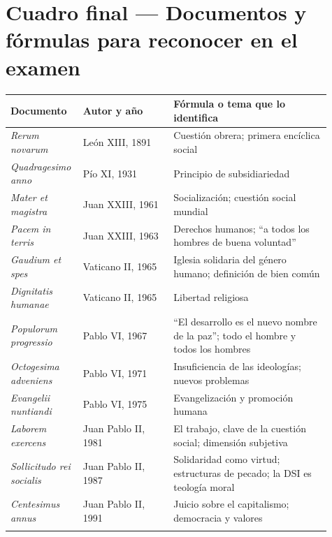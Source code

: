 \documentclass[10pt,a4paper]{article}
\begin{document}
\clearpage\section{Cuadro final --- Documentos y fórmulas para reconocer en el examen}

{\small\renewcommand{\arraystretch}{1.25}
\begin{longtable}{>{\raggedright\arraybackslash}p{0.163\linewidth}>{\raggedright\arraybackslash}p{0.275\linewidth}>{\raggedright\arraybackslash}p{0.472\linewidth}}
\toprule
\textbf{Documento} & \textbf{Autor y año} & \textbf{Fórmula o tema que lo identifica} \\ \midrule \endhead
\textit{Rerum novarum} & León XIII, 1891 & Cuestión obrera; primera encíclica social \\ \addlinespace[2pt]
\textit{Quadragesimo anno} & Pío XI, 1931 & Principio de subsidiariedad \\ \addlinespace[2pt]
\textit{Mater et magistra} & Juan XXIII, 1961 & Socialización; cuestión social mundial \\ \addlinespace[2pt]
\textit{Pacem in terris} & Juan XXIII, 1963 & Derechos humanos; ``a todos los hombres de buena voluntad'' \\ \addlinespace[2pt]
\textit{Gaudium et spes} & Vaticano II, 1965 & Iglesia solidaria del género humano; definición de bien común \\ \addlinespace[2pt]
\textit{Dignitatis humanae} & Vaticano II, 1965 & Libertad religiosa \\ \addlinespace[2pt]
\textit{Populorum progressio} & Pablo VI, 1967 & ``El desarrollo es el nuevo nombre de la paz''; todo el hombre y todos los hombres \\ \addlinespace[2pt]
\textit{Octogesima adveniens} & Pablo VI, 1971 & Insuficiencia de las ideologías; nuevos problemas \\ \addlinespace[2pt]
\textit{Evangelii nuntiandi} & Pablo VI, 1975 & Evangelización y promoción humana \\ \addlinespace[2pt]
\textit{Laborem exercens} & Juan Pablo II, 1981 & El trabajo, clave de la cuestión social; dimensión subjetiva \\ \addlinespace[2pt]
\textit{Sollicitudo rei socialis} & Juan Pablo II, 1987 & Solidaridad como virtud; estructuras de pecado; la DSI es teología moral \\ \addlinespace[2pt]
\textit{Centesimus annus} & Juan Pablo II, 1991 & Juicio sobre el capitalismo; democracia y valores \\ \addlinespace[2pt]

\end{longtable}}
\end{document}

